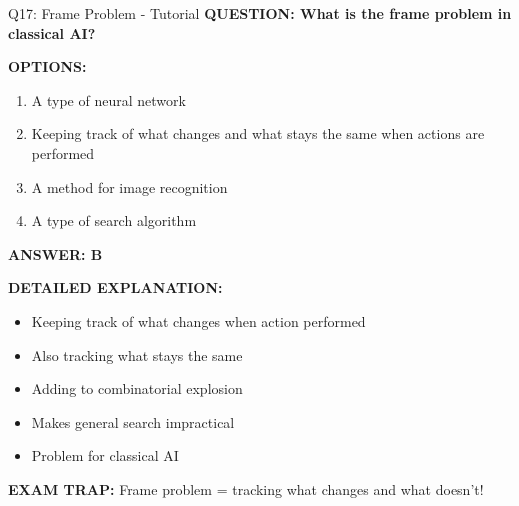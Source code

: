 \documentclass[8pt]{beamer}
\begin{document}
	\begin{frame}{Q17: Frame Problem - Tutorial}
		\fontsize{6.5}{7.5}\selectfont
		\textbf{QUESTION: What is the frame problem in classical AI?}
		
		\vspace{0.1cm}
		\textbf{OPTIONS:}
		\begin{enumerate}
			\item A type of neural network
			\item Keeping track of what changes and what stays the same when actions are performed
			\item A method for image recognition
			\item A type of search algorithm
		\end{enumerate}
		
		\vspace{0.1cm}
		\textcolor{myblue}{\textbf{ANSWER: B}}
		
		\vspace{0.1cm}
		\textbf{DETAILED EXPLANATION:}
		\begin{itemize}
			\item Keeping track of what changes when action performed
			\item Also tracking what stays the same
			\item Adding to combinatorial explosion
			\item Makes general search impractical
			\item Problem for classical AI
		\end{itemize}
		
		\vspace{0.1cm}
		\textcolor{myred}{\textbf{EXAM TRAP:}} Frame problem = \textcolor{myblue}{tracking what changes and what doesn't}!
	\end{frame}
	
\end{document}

